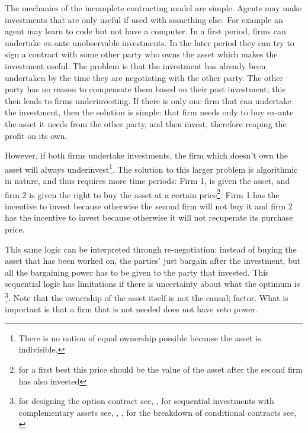 \documentclass[12pt]{report}
\numberwithin{equation}{section}
\begin{document}
The mechanics of the incomplete contracting model are simple. Agents may make investments that are only useful if used with something else. For example an agent may learn to code but not have a computer. In a first period, firms can undertake ex-ante unobservable investments. In the later period they can try to sign a contract with some other party who owns the asset which makes the investment useful. The problem is that the investment has already been undertaken by the time they are negotiating with the other party. The other party has no reason to compensate them based on their past investment; this then leads to firms underinvesting. If there is only one firm that can undertake the investment, then the solution is simple: that firm needs only to buy ex-ante the asset it needs from the other party, and then invest, therefore reaping the profit on its own.

However, if both firms undertake investments, the firm which doesn't own the asset will always underinvest\footnote{There is no notion of equal ownership possible because the asset is indivisible.}.  The solution to this larger problem is algorithmic in nature, and thus requires more time periods: Firm 1, is given the asset, and firm 2 is given the right to buy the asset at a certain price\footnote{for a first best this price should be the value of the asset after the second firm has also invested}. Firm 1 has the incentive to invest because otherwise the second firm will not buy it and firm 2 has the incentive to invest because otherwise it will not recuperate its purchase price.

This same logic can be interpreted through re-negotiation: instead of buying the asset that has been worked on, the parties’ just bargain after the investment, but all the bargaining power has to be given to the party that invested. This sequential logic has limitations if there is uncertainty about what the optimum is \footnote{for designing the option contract see, \cite{Noldeke1998}, for sequential investments with complementary assets see, \cite{Zhang2014},\cite{bessen_maskin} , for the breakdown of conditional contracts see, \cite{Maskin1999}}. Note that the ownership of the asset itself is not the causal; factor. What is important is that a firm that is not needed does not have veto power.
\end{document}
